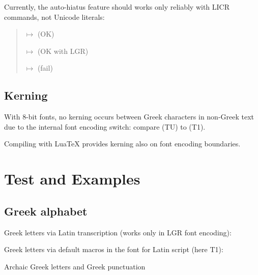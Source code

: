 \documentclass{article}
\newcommand*{\greekfontencoding}{TU}
\newcommand*{\greekfontencoding}{LGR}
\newcommand*{\latinencoding}{T1}
\begin{document}
Currently, the auto-hiatus feature should works only reliably with
LICR commands, not Unicode literals:
\begin{quote}
 $\mapsto$
(OK)

 $\mapsto$
 (OK with LGR)

 $\mapsto$
 (fail)
\end{quote}

\subsection{Kerning}

With 8-bit fonts, no kerning occurs between Greek characters in non-Greek
text due to the internal font encoding switch: compare
\ensuregreek{\textAlpha\textUpsilon\textAlpha} (\greekfontencoding) to
\textAlpha\textUpsilon\textAlpha{} (\latinencoding).

Compiling with LuaTeX provides kerning also on font encoding boundaries.

\section{Test and Examples}

\subsection{Greek alphabet}

Greek letters via Latin transcription (works only in LGR font encoding):

\begin{quote}

\end{quote}
%
Greek letters via default macros in the font for Latin script
(here \latinencoding):

\newcommand*{\greekAlphabetsample}{
  \textAlpha{} \textBeta{} \textGamma{} \textDelta{} \textEpsilon{}
  \textZeta{} \textEta{} \textTheta{} \textIota{} \textKappa{}
  \textLambda{} \textMu{} \textNu{} \textXi{} \textOmicron{} \textPi{}
  \textRho{} \textSigma{} \textTau{} \textUpsilon{} \textPhi{}
  \textChi{} \textPsi{} \textOmega{}
  }
\newcommand*{\greekalphabetsample}{
  \textalpha{} \textbeta{} \textgamma{} \textdelta{} \textepsilon{}
  \textzeta{} \texteta{} \texttheta{} \textiota{} \textkappa{}
  \textlambda{} \textmu{} \textnu{} \textxi{} \textomicron{} \textpi{}
  \textrho{} \textsigma{} \textvarsigma{} \texttau{} \textupsilon{}
  \textphi{} \textchi{} \textpsi{} \textomega{}
}
\begin{quote}
  \greekalphabetsample

  \greekAlphabetsample
\end{quote}
%
Archaic Greek letters and Greek punctuation
\end{document}
